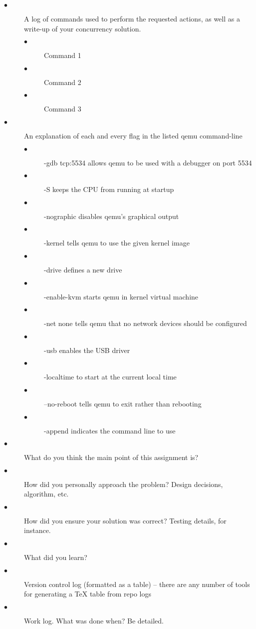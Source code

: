 \documentclass[titlepage]{article}
\begin{document}
\begin{description}
  \item[$\bullet$] A log of commands used to perform the requested actions, as well as a write-up of your concurrency solution.
  \begin{description}
    \item[$\bullet$] Command 1
    \item[$\bullet$] Command 2
    \item[$\bullet$] Command 3
  \end{description}
  \item[$\bullet$] An explanation of each and every flag in the listed qemu command-line
  \begin{description}
    \item[$\bullet$] -gdb tcp:5534 allows qemu to be used with a debugger on port 5534
    \item[$\bullet$] -S keeps the CPU from running at startup
    \item[$\bullet$] -nographic disables qemu's graphical output
    \item[$\bullet$] -kernel tells qemu to use the given kernel image
    \item[$\bullet$] -drive defines a new drive
    \item[$\bullet$] -enable-kvm starts qemu in kernel virtual machine
    \item[$\bullet$] -net none tells qemu that no network devices should be configured
    \item[$\bullet$] -usb enables the USB driver
    \item[$\bullet$] -localtime to start at the current local time
    \item[$\bullet$] --no-reboot tells qemu to exit rather than rebooting
    \item[$\bullet$] -append indicates the command line to use
  \end{description}
  \item[$\bullet$] What do you think the main point of this assignment is?
  \item[$\bullet$] How did you personally approach the problem? Design decisions, algorithm, etc.
  \item[$\bullet$] How did you ensure your solution was correct? Testing details, for instance.
  \item[$\bullet$] What did you learn?
  \item[$\bullet$] Version control log (formatted as a table) -- there are any number of tools for generating a TeX table from repo logs
  \item[$\bullet$] Work log. What was done when? Be detailed.
\end{description}
\end{document}
